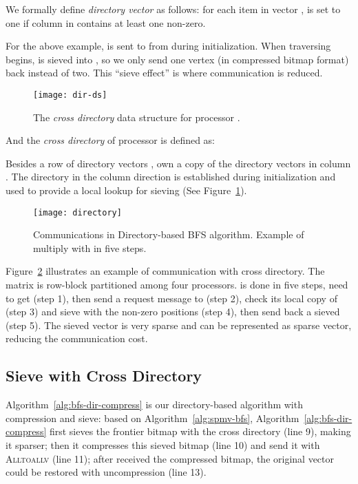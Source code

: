 \documentclass[conference]{IEEEtran}
\begin{document}
We formally define \textit{directory vector} as follows: for each item 
in vector ,  is set to one if column  in  contains
at least one non-zero.

For the above example,  is sent to  from  during
initialization. When traversing begins,  is sieved into , so we only send one vertex (in
compressed bitmap format) back instead of two. This ``sieve effect'' is where
communication is reduced.

\begin{figure}[t]
\centering
  \texttt{[image: dir-ds]}
  \caption{The \textit{cross directory} data structure for processor .}
  \label{fig:dir-ds}
\end{figure}

And the \textit{cross directory} of processor  is defined as:

Besides a row of directory vectors ,
 own a copy of the directory vectors  in
column . The directory in the column direction is established during
initialization and used to provide a local lookup for sieving (See
Figure~\ref{fig:dir-ds}).

\begin{figure}[t]
  \centering
  \texttt{[image: directory]}
  \caption{Communications in Directory-based BFS algorithm. Example of
    multiply  with  in five steps.}
  \label{fig:cross-directory}
\end{figure}

Figure~\ref{fig:cross-directory} illustrates an example of
communication with cross directory. The matrix is row-block partitioned among
four processors.
 is done in five steps,  need to get  (step
1),  then send a request message to  (step 2),  check its local
copy of  (step 3) and sieve  with the non-zero positions (step
4), then  send back a sieved  (step 5). The sieved vector is
very sparse and can be represented as sparse vector, reducing the
communication cost.

\subsection{Sieve with Cross Directory}
\label{sec:dir-bfs-alg}

Algorithm~\ref{alg:bfs-dir-compress} is our directory-based algorithm with
compression and sieve: based on Algorithm~\ref{alg:spmv-bfs},
Algorithm~\ref{alg:bfs-dir-compress} first sieves the frontier bitmap with the
cross directory (line 9), making it sparser; then it compresses this sieved
bitmap (line 10) and send it with \textsc{Alltoallv} (line 11); after received
the compressed bitmap, the original vector could be restored with
uncompression (line 13).
\end{document}
